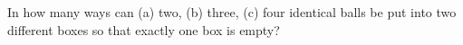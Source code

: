 In how many ways can (a) two, (b) three, (c) four identical balls be put into two different boxes so that exactly one box is empty?
